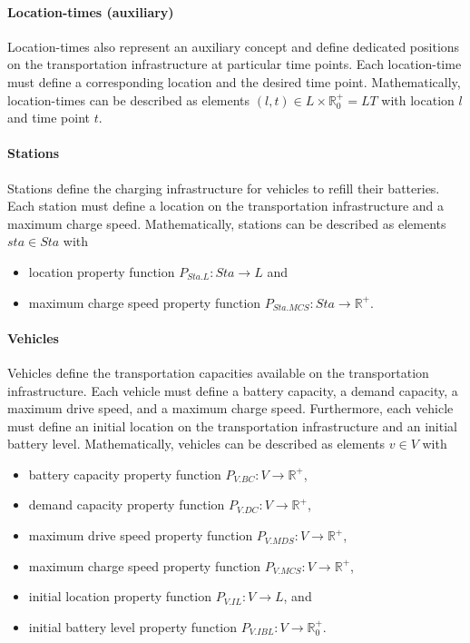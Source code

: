 \documentclass{article}
\begin{document}
    \paragraph{Location-times (auxiliary)}
    Location-times also represent an auxiliary concept and define dedicated positions on the transportation infrastructure at particular time points.
    Each location-time must define a corresponding location and the desired time point.
    Mathematically, location-times can be described as elements $(l, t) \in L \times \mathbb{R}_0^+ = LT$ with location $l$ and time point $t$.

    \paragraph{Stations}
    Stations define the charging infrastructure for vehicles to refill their batteries.
    Each station must define a location on the transportation infrastructure and a maximum charge speed.
    Mathematically, stations can be described as elements $sta \in Sta$ with
    \begin{itemize}
        \item location property function $P_{Sta.L}: Sta \rightarrow L$ and
        \item maximum charge speed property function $P_{Sta.MCS}: Sta \rightarrow \mathbb{R}^+$.
    \end{itemize}

    \paragraph{Vehicles}
    Vehicles define the transportation capacities available on the transportation infrastructure.
    Each vehicle must define a battery capacity, a demand capacity, a maximum drive speed, and a maximum charge speed.
    Furthermore, each vehicle must define an initial location on the transportation infrastructure and an initial battery level.
    Mathematically, vehicles can be described as elements $v \in V$ with
    \begin{itemize}
        \item battery capacity property function $P_{V.BC}: V \rightarrow \mathbb{R}^+$,
        \item demand capacity property function $P_{V.DC}: V \rightarrow \mathbb{R}^+$,
        \item maximum drive speed property function $P_{V.MDS}: V \rightarrow \mathbb{R}^+$,
        \item maximum charge speed property function $P_{V.MCS}: V \rightarrow \mathbb{R}^+$,
        \item initial location property function $P_{V.IL}: V \rightarrow L$, and
        \item initial battery level property function $P_{V.IBL}: V \rightarrow \mathbb{R}_0^+$.
    \end{itemize}
\end{document}
